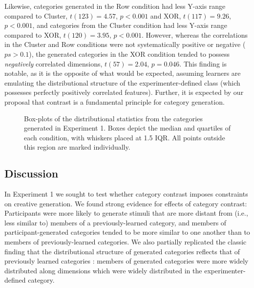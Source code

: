 \documentclass[12pt]{article}
\newcommand\inputpgf[2]{{
\let\pgfimageWithoutPath\pgfimage
\renewcommand{\pgfimage}[2][]{\pgfimageWithoutPath[##1]{#1/##2}}

}}
\begin{document}
\begin{flushleft}
Likewise, categories generated in the Row condition had less Y-axis range compared to Cluster, $t(123) = 4.57$, $p < 0.001$ and XOR, $t(117) = 9.26$, $p < 0.001$, and categories from the Cluster condition had less Y-axis range compared to XOR, $t(120) = 3.95$, $p < 0.001$. However, whereas the correlations in the Cluster and Row conditions were not systematically positive or negative ($ps > 0.1$), the generated categories in the XOR condition tended to possess \textit{negatively} correlated dimensions, $t(57) = 2.04$, $p = 0.046$. This finding is notable, as it is the opposite of what would be expected, assuming learners are emulating the distributional structure of the experimenter-defined class (which possesses perfectly positively correlated features). Further, it is expected by our proposal that contrast is a fundamental principle for category generation.

\begin{figure}
    \begin{center}
    \inputpgf{figs/}{e1-statsboxes.pgf}
    \caption{Box-plots of the distributional statistics from the categories generated in Experiment 1. Boxes depict the median and quartiles of each condition, with whiskers placed at 1.5 IQR. All points outside this region are marked individually.}
    \label{fig:e1-statsboxes}
    \end{center}
\end{figure}


\subsection{Discussion}


In Experiment 1 we sought to test whether category contrast imposes constraints on creative generation. We found strong evidence for effects of category contrast: Participants were more likely to generate stimuli that are more distant from (i.e., less similar to) members of a previously-learned category, and members of participant-generated categories tended to be more similar to one another than to members of previously-learned categories. We also partially replicated the classic finding that the distributional structure of generated categories reflects that of previously learned categories \citep{jern2013probabilistic,ward1994structured}: members of generated categories were more widely distributed along dimensions which were widely distributed in the experimenter-defined category. 


\end{flushleft}
\end{document}
